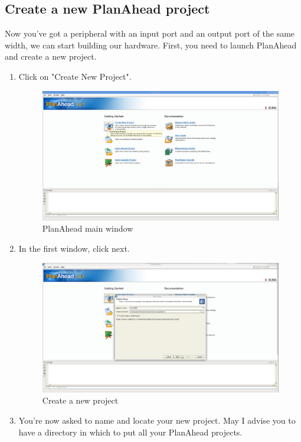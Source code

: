 \documentclass{article}
\begin{document}
	\subsection{Create a new PlanAhead project}
	Now you've got a peripheral with an input port and an output port of the
	same width, we can start building our hardware.
	First, you need to launch PlanAhead and create a new project.
	\begin{enumerate}
	\item Click on "Create New Project".
	\begin{figure}
	\includegraphics[scale=0.25]{pictures/PlanAheadOpenning.png}
	\caption{PlanAhead main window}
	\end{figure}
	\item In the first window, click next.
	\begin{figure}
	\includegraphics[scale=0.25]{pictures/CreateNewProject1.png}
	\caption{Create a new project}
	\end{figure}
	\item You're now asked to name and locate your new project. May I advise you to
	have a directory in which to put all your PlanAhead projects.

\end{enumerate}
\end{document}
